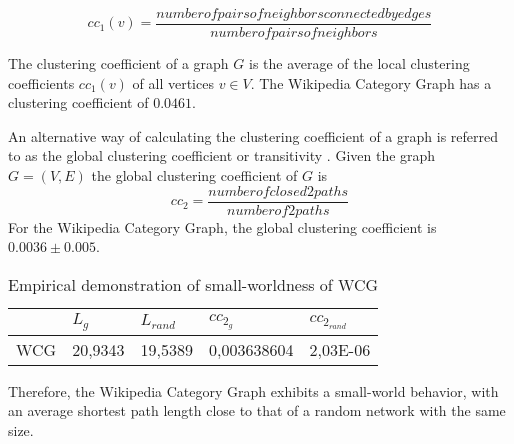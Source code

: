 \begin{equation}\label{eq:cc1}
cc_1(v) = \dfrac{number of pairs of neighbors connected by edges}{number of pairs of neighbors}  
\end{equation} 

The clustering coefficient of a graph $G$ is the average of the local clustering coefficients $cc_1(v)$ of all vertices $v \in V$. The Wikipedia Category Graph has a clustering coefficient of $0.0461$. 

An alternative way of calculating the clustering coefficient of a graph is referred to as the global clustering coefficient or transitivity \cite{newman2001random}. Given the graph $G = (V,E)$ the global clustering coefficient of $G$ is
\begin{equation}\label{eq:cc2}
cc_2 = \dfrac{number of closed 2paths}{number of 2paths}
\end{equation} For the Wikipedia Category Graph, the global clustering coefficient is $0.0036\pm0.005$. 



\begin{table}[!h]
\centering
\begin{tabular}{@{}lllll@{}}
\toprule
    & $L_g$       & $L_{rand}$       & $cc_{2_g}$           & $cc_{2_{rand}}$        \\ \midrule
WCG & 20,9343 & 19,5389 & 0,003638604 & 2,03E-06 \\ \bottomrule
\end{tabular}
\caption{Empirical demonstration of small-worldness of WCG }
\label{small-worldness}
\end{table}

Therefore, the Wikipedia Category Graph exhibits a small-world behavior, with an average shortest path length close to that of a random network with the same size.




